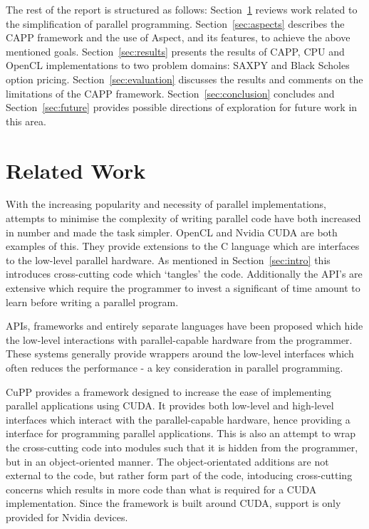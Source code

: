 \documentclass{sig-alternate-05-2015}
\begin{document}
The rest of the report is structured as follows: Section~\ref{sec:related}
reviews work related to the simplification of parallel programming.
Section~\ref{sec:aspects} describes the  CAPP framework and the use 
of Aspect\CPP, and its features, to achieve the above mentioned goals. Section~\ref{sec:results}
presents the results of CAPP, CPU and OpenCL implementations to two
problem domains:
SAXPY and Black Scholes option pricing.
Section~\ref{sec:evaluation} discusses the results and comments on the limitations 
of the  CAPP framework.
Section~\ref{sec:conclusion} concludes and Section~\ref{sec:future}
provides possible directions of exploration for future work in this area.

\section{Related Work}\label{sec:related}

With the increasing popularity and necessity of parallel implementations,
attempts to minimise the complexity of writing parallel code have both increased
in number and made the task simpler. OpenCL and Nvidia CUDA are both examples of
this. They provide extensions to the C language which are interfaces to the low-level
parallel hardware. As mentioned in Section~\ref{sec:intro} this
introduces cross-cutting code which `tangles' the \CPP code. Additionally the API's 
are extensive which require the programmer to invest a significant of time amount to
learn before writing a parallel program.

APIs, frameworks and entirely separate languages have been proposed which hide the low-level 
interactions with  parallel-capable hardware from the programmer.
These systems generally provide wrappers around the low-level interfaces 
which often reduces the performance - a key consideration in parallel
programming.

CuPP \cite{breit:cupp} provides a \CPP framework designed to increase the ease of implementing parallel
applications using CUDA. It provides both low-level and high-level interfaces
which interact with the parallel-capable hardware, hence providing a \CPP
interface for programming parallel applications. This is also an attempt to wrap
the cross-cutting code into modules such that it is hidden from  the programmer,
but in an object-oriented manner. The object-orientated additions are not
external to the \CPP code, but rather form part of the \CPP code, intoducing
cross-cutting concerns which results in more code than what is required for a 
CUDA implementation. Since the framework is built around CUDA, support is only provided 
for Nvidia devices.
\end{document}
